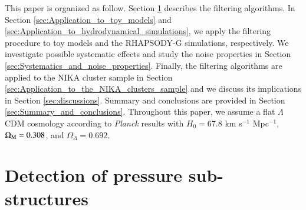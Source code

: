 \documentclass[twocolumn,traditabstract]{aa}
\begin{document}
This paper is organized as follow. Section \ref{sec:Pressure_substructures_detection} describes the filtering algorithms. In Section \ref{sec:Application_to_toy_models} and \ref{sec:Application_to_hydrodynamical_simulations}, we apply the filtering procedure to toy models and the RHAPSODY-G simulations, respectively. We investigate possible systematic effects and study the noise properties in Section \ref{sec:Systematics_and_noise_properties}. Finally, the filtering algorithms are applied to the NIKA cluster sample in Section \ref{sec:Application_to_the_NIKA_clusters_sample} and we discuss its implications in Section \ref{sec:discussions}. Summary and conclusions are provided in Section \ref{sec:Summary_and_conclusions}. Throughout this paper, we assume a flat $\Lambda$CDM cosmology according to \textit{Planck} results \citep{Planck2016XIII} with $H_0 = 67.8$ km s$^{-1}$ Mpc$^{-1}$, $\Omega_{\rm M} = 0.308$, and $\Omega_{\Lambda} = 0.692$.

\section{Detection of pressure sub-structures}\label{sec:Pressure_substructures_detection}
\end{document}
